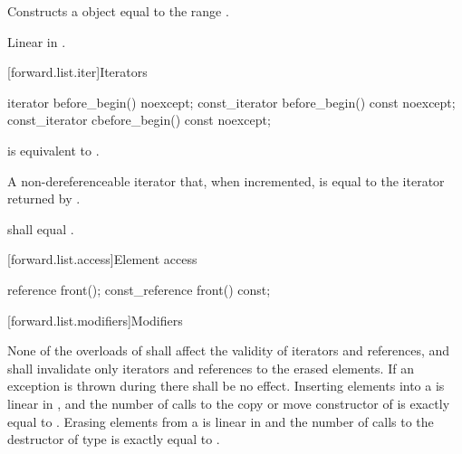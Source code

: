 \begin{itemdescr}
\pnum
\effects
Constructs a  object equal to the range .

\pnum
\complexity
Linear in .
\end{itemdescr}

[forward.list.iter]{Iterators}

%
%
\begin{itemdecl}
iterator before_begin() noexcept;
const_iterator before_begin() const noexcept;
const_iterator cbefore_begin() const noexcept;
\end{itemdecl}

\begin{itemdescr}
\pnum
\effects
{} is equivalent to
.

\pnum
\returns
A non-dereferenceable iterator that, when incremented, is equal to the iterator
returned by .

\pnum
\remarks
{} shall equal .
\end{itemdescr}

[forward.list.access]{Element access}

%
\begin{itemdecl}
reference front();
const_reference front() const;
\end{itemdecl}

\begin{itemdescr}
\pnum
\returns
{}
\end{itemdescr}

[forward.list.modifiers]{Modifiers}

\pnum
None of the overloads of  shall affect the validity of iterators and
references, and  shall invalidate only iterators and references to
the erased elements. If an exception is thrown during  there shall
be no effect. Inserting  elements into a  is linear in
, and the number of calls to the copy or move constructor of  is
exactly equal to . Erasing  elements from a  is
linear in  and the number of calls to the destructor of type  is
exactly equal to .

